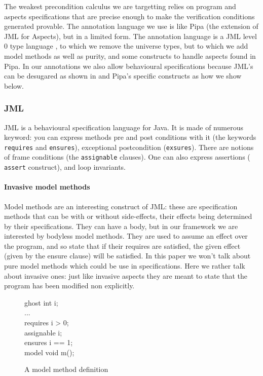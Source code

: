 The weakest precondition calculus we are targetting relies on program
and aspects specifications that are precise enough to make the
verification conditions generated provable.  The annotation language
we use is like Pipa \cite{ZhaoR03} (the extension of JML for Aspects),
but in a limited form. The annotation language is a JML level 0 type
language \cite{Leavens-etal07}, to which we remove the universe types,
but to which we add model methods as well as purity, and some
constructs to handle aspects found in Pipa. In our annotations we also
allow behavioural specifications because JML's can be desugared as
shown in \cite{RaghavanL00} and Pipa's specific constructs as how we
show below.

\subsubsection{JML} 
JML is a behavioural specification language for Java. It is made of
numerous keyword: you can express methods pre and post conditions with
it (the keywords {\tt requires} and {\tt ensures}), exceptional
postcondition ({\tt exsures}). There are notions of frame conditions
(the {\tt assignable} clauses). One can also express assertions ({\tt
assert} construct), and loop invariants.

\paragraph{Invasive model methods} 
Model methods are an interesting construct of JML: these are
specification methods that can be with or without side-effects, their
effects being determined by their specifications.  They can have a
body, but in our framework we are interested by bodyless model
methods. They are used to assume an effect over the program, and so
state that if their requires are satisfied, the given effect (given by
the ensure clause) will be satisfied.  In this paper we won't talk
about pure model methods which could be use in specifications. Here we
rather talk about invasive ones: just like invasive aspects they are
meant to state that the program has been modified non explicitly.
\begin{figure}
\begin{center}\begin{minipage}{3cm}
\bcode
ghost int i;\\
...\\
requires i > 0;\\
assignable i;\\
ensures i == 1;\\
model void m();
\ecode
\end{minipage}\end{center}
\caption{A model method definition}
\label{model_meth_def}
\end{figure}


